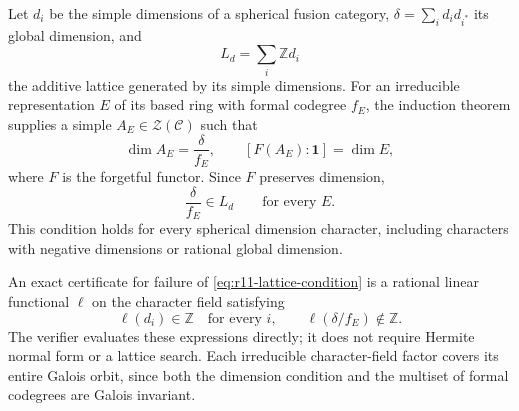 \documentclass[11pt,a4paper]{article}
\begin{document}
Let $d_i$ be the simple dimensions of a spherical fusion category,
$\delta=\sum_i d_i d_{i^*}$ its global dimension, and
\[
 L_d=\sum_i\mathbb Z d_i
\]
the additive lattice generated by its simple dimensions. For an
irreducible representation $E$ of its based ring with formal codegree
$f_E$, the induction theorem
\cite[Theorem~2.13]{OstrikPivotal} supplies a simple
$A_E\in\mathcal Z(\mathcal C)$ such that
\begin{equation}\label{eq:r11-central-dimension}
 \dim A_E=\frac{\delta}{f_E},\qquad
 [F(A_E):\mathbf1]=\dim E,
\end{equation}
where $F$ is the forgetful functor. Since $F$ preserves dimension,
\begin{equation}\label{eq:r11-lattice-condition}
 \frac{\delta}{f_E}\in L_d
 \qquad\text{for every }E.
\end{equation}
This condition holds for every spherical dimension character, including
characters with negative dimensions or rational global dimension.

An exact certificate for failure of
\eqref{eq:r11-lattice-condition} is a rational linear functional
$\ell$ on the character field satisfying
\[
 \ell(d_i)\in\mathbb Z\quad\text{for every }i,
 \qquad \ell(\delta/f_E)\notin\mathbb Z.
\]
The verifier evaluates these expressions directly; it does not require
Hermite normal form or a lattice search. Each irreducible character-field
factor covers its entire Galois orbit, since both the dimension condition
and the multiset of formal codegrees are Galois invariant.
\end{document}
